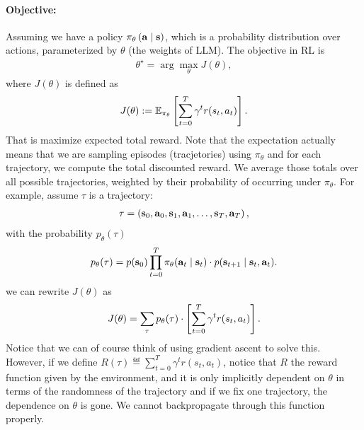 \documentclass[11pt]{article}  %
\begin{document}
\paragraph{Objective:} Assuming we have a policy $\pi_{\theta}\left( \mathbf{a} \mid \mathbf{s} \right)$, which is a probability distribution over actions, parameterized by $\theta$ (the weights of LLM).
The objective in RL is 
\begin{align*}
  \theta^\star = \arg\max_{\theta} J(\theta),
\end{align*}
where $J(\theta)$ is defined as 
\begin{align}
  \label{eq:J}
  J(\theta) := \mathbb{E}_{\pi_\theta}\left[\sum_{t=0}^{T}\gamma^tr(s_t, a_t)\right].
\end{align}
That is maximize expected total reward.
Note that the expectation actually means that we are sampling episodes (tracjetories) using $\pi_{\theta}$ and for each trajectory, we compute the total discounted reward.
We average those totals over all possible trajectories, weighted by their probability of occurring under $\pi_\theta$.
For example, assume $\tau$ is a trajectory:
\begin{align*}
  \tau = \left( \mathbf{s}_0, \mathbf{a}_0, \mathbf{s}_1, \mathbf{a}_1, \hdots, \mathbf{s}_T, \mathbf{a}_T \right),
\end{align*} 
with the probability $p_\theta(\tau)$
\begin{align*}
  p_{\theta}(\tau) = p(\mathbf{s}_0)\prod_{t=0}^{T}\pi_{\theta}(\mathbf{a}_t \mid \mathbf{s}_t)\cdot p(\mathbf{s}_{t+1} \mid \mathbf{s}_t, \mathbf{a}_t).
\end{align*}
we can rewrite $J(\theta)$ as 
\begin{align*}
  J(\theta) = \sum_{\tau} p_\theta(\tau)\cdot\left[ \sum_{t=0}^{T}\gamma^tr(s_t, a_t) \right].
\end{align*}
Notice that we can of course think of using gradient ascent to solve this. 
However, if we define $R(\tau) \eqdef \sum_{t=0}^{T}\gamma^tr(s_t, a_t)$, notice that $R$ the reward function given by the environment, and it is only implicitly dependent on $\theta$ in terms of the randomness of the trajectory and if we fix one trajectory, the dependence on $\theta$ is gone.
We cannot backpropagate through this function properly.
\end{document}
